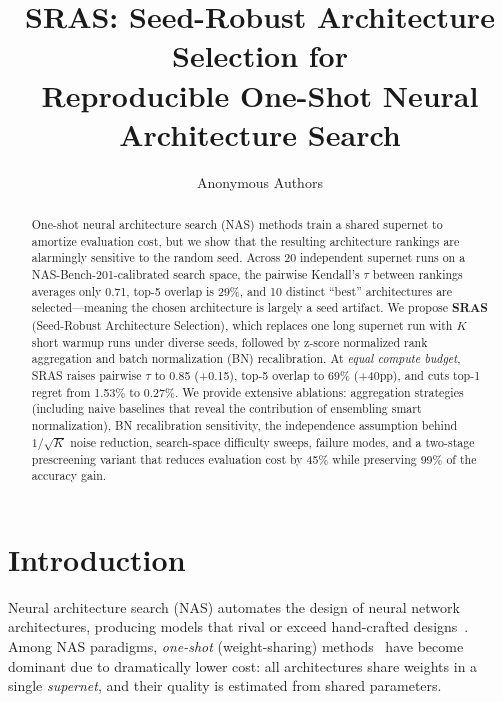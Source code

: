 \documentclass[10pt,twocolumn,letterpaper]{article}
\title{SRAS: Seed-Robust Architecture Selection for\\ Reproducible One-Shot Neural Architecture Search}
\author{
Anonymous Authors
}
\newcommand{\method}{SRAS}
\newcommand{\methodfull}{Seed-Robust Architecture Selection}
\begin{document}
\maketitle

\begin{abstract}
One-shot neural architecture search (NAS) methods train a shared supernet to amortize evaluation cost, but we show that the resulting architecture rankings are alarmingly sensitive to the random seed.
Across 20 independent supernet runs on a NAS-Bench-201-calibrated search space, the pairwise Kendall's $\tau$ between rankings averages only 0.71, top-5 overlap is 29\%, and 10 distinct ``best'' architectures are selected---meaning the chosen architecture is largely a seed artifact.
We propose \textbf{\method{}} (\methodfull{}), which replaces one long supernet run with $K$ short warmup runs under diverse seeds, followed by z-score normalized rank aggregation and batch normalization (BN) recalibration.
At \textit{equal compute budget}, \method{} raises pairwise $\tau$ to 0.85 (+0.15), top-5 overlap to 69\% (+40pp), and cuts top-1 regret from 1.53\% to 0.27\%.
We provide extensive ablations: aggregation strategies (including naive baselines that reveal the contribution of ensembling \vs smart normalization), BN recalibration sensitivity, the independence assumption behind $1/\sqrt{K}$ noise reduction, search-space difficulty sweeps, failure modes, and a two-stage prescreening variant that reduces evaluation cost by 45\% while preserving 99\% of the accuracy gain.
\end{abstract}

\section{Introduction}
\label{sec:intro}

Neural architecture search (NAS) automates the design of neural network architectures, producing models that rival or exceed hand-crafted designs~\cite{liu2019darts,cai2019proxylessnas,elsken2019survey}. Among NAS paradigms, \textit{one-shot} (weight-sharing) methods~\cite{pham2018enas,guo2020spos} have become dominant due to dramatically lower cost: all architectures share weights in a single \textit{supernet}, and their quality is estimated from shared parameters.
\end{document}
